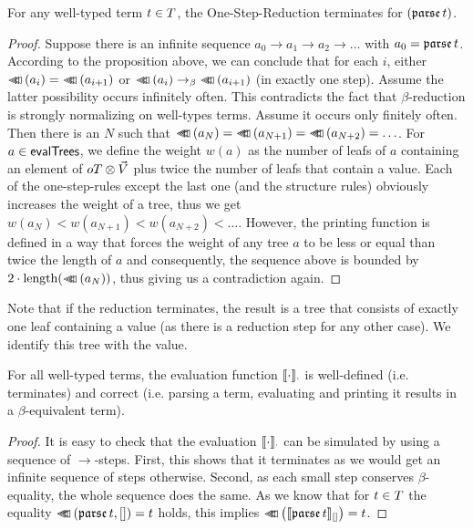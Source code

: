 \documentclass[submission,copyright,creativecommons]{eptcs}
\begin{document}
\begin{prop}
For any well-typed term $t \in T$, the One-Step-Reduction terminates for $(\mathfrak {parse } \, t)$.
\end{prop}
\begin{proof}
Suppose there is an infinite sequence $a_0 \rightarrow a_1 \rightarrow a_2 \rightarrow \ldots$ with $a_0 = \mathfrak {parse } \, t$. According to the proposition above, we can conclude that for each $i$, either $\prTree {a_i} = \prTree {a_{i+1}}$ or $\prTree {a_i} \rightarrow_\beta \prTree {a_{i+1}}$ (in exactly one step). Assume the latter possibility occurs infinitely often. This contradicts the fact that $\beta$-reduction is strongly normalizing on well-types terms. Assume it occurs only finitely often. Then there is an $N$ such that $\prTree {a_N} = \prTree {a_{N+1}} = \prTree {a_{N+2}} = \ldots$. For $a \in \mathsf{evalTrees}$, we define the weight $w(a)$ as the number of leafs of $a$ containing an element of $oT \otimes \vec {V}$ plus twice the number of leafs that contain a value. Each of the one-step-rules except the last one (and the structure rules) obviously increases the weight of a tree, thus we get $w(a_N) < w(a_{N+1}) < w(a_{N+2}) < \ldots$. However, the printing function is defined in a way that forces the weight of any tree $a$ to be less or equal than twice the length of $a$ and consequently, the sequence above is bounded by $2 \cdot \mbox{length}( \lhd \hspace{-8pt} \lhd \hspace{-8pt} \lhd \left( a_N \right))$, thus giving us a contradiction again.
\end{proof}

Note that if the reduction terminates, the result is a tree that consists of exactly one leaf containing a value (as there is a reduction step for any other case). We identify this tree with the value.

\begin{cor}
For all well-typed terms, the evaluation function $\llbracket{\cdot}\rrbracket_{\cdot}$ is well-defined (i.e. terminates) and correct (i.e. parsing a term, evaluating and printing it results in a $\beta$-equivalent term).
\end{cor}
\begin{proof}
It is easy to check that the evaluation $\llbracket{\cdot}\rrbracket_{\cdot}$ can be simulated by using a sequence of $\rightarrow$-steps. First, this shows that it terminates as we would get an infinite sequence of steps otherwise. Second, as each small step conserves $\beta$-equality, the whole sequence does the same. As we know that for $t \in T$ the equality $\lhd \hspace{-8pt} \lhd \hspace{-8pt} \lhd \left( \mathfrak {parse } \, t , [] \right) = t$ holds, this implies $\lhd \hspace{-8pt} \lhd \hspace{-8pt} \lhd \left( \llbracket{\mathfrak {parse } \,t}\rrbracket_{[]} \right) = t$. 
\end{proof}
\end{document}
